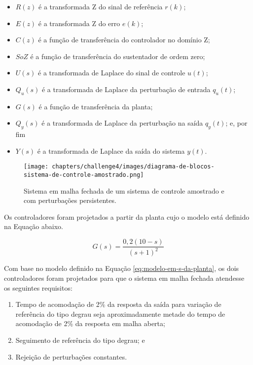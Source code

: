 \begin{itemize}
    \item $R(z)$ é a transformada Z do sinal de referência $r(k)$;
    \item $E(z)$ é a transformada Z do erro $e(k)$;
    \item $C(z)$ é a função de transferência do controlador no domínio Z;
    \item $SoZ$ é a função de transferência do sustentador de ordem zero;
    \item $U(s)$ é a transformada de Laplace do sinal de controle $u(t)$;
    \item $Q_{u}(s)$ é a transformada de Laplace da perturbação de entrada
    $q_{u}(t)$;
    \item $G(s)$ é a função de transferência da planta;
    \item $Q_{y}(s)$ é a transformada de Laplace da perturbação na saída
    $q_{y}(t)$; e, por fim
    \item $Y(s)$ é a transformada de Laplace da saída do sistema $y(t)$.
\end{itemize}

\begin{figure}[ht!]
	\centering
	\caption{Sistema em malha fechada de um sistema de controle amostrado e com
    perturbações persistentes.}
	\label{fig:diagrama-de-blocos-malha-fechada}
	\texttt{[image: chapters/challenge4/images/diagrama-de-blocos-sistema-de-controle-amostrado.png]}
\end{figure}

Os controladores foram projetados a partir da planta cujo o modelo está definido
na Equação abaixo.

\begin{equation}
    \label{eq:modelo-em-s-da-planta}
    G(s) = \frac{0,2(10 - s)}{(s+1)^{2}}
\end{equation}

Com base no modelo definido na Equação \ref{eq:modelo-em-s-da-planta}, os dois
controladores foram projetados para que o sistema em malha fechada atendesse os
seguintes requisitos:

\begin{enumerate}
    \item Tempo de acomodação de 2\% da resposta da saída para variação de
    referência do tipo degrau seja aproximadamente metade do tempo de acomodação
    de 2\% da resposta em malha aberta;
    \item Seguimento de referência do tipo degrau; e
    \item Rejeição de perturbações constantes.
\end{enumerate}


